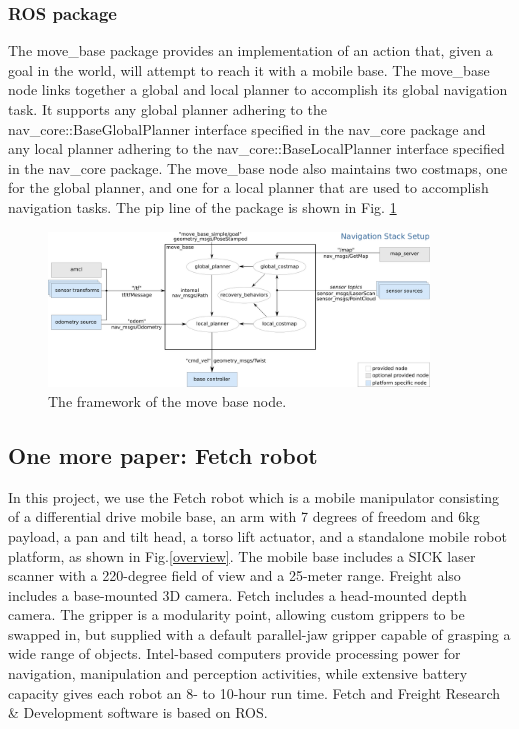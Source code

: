 \documentclass[12pt,draftclsnofoot,onecolumn]{IEEEtran}
\begin{document}
	\subsubsection{ROS package}
	The move\_base package provides an implementation of an action that, given a goal in the world, will attempt to reach it with a mobile base. The move\_base node links together a global and local planner to accomplish its global navigation task. 
	It supports any global planner adhering to the nav\_core::BaseGlobalPlanner interface specified in the nav\_core package 
	and any local planner adhering to the nav\_core::BaseLocalPlanner interface specified in the nav\_core package. 
	The move\_base node also maintains two costmaps, one for the global planner, 
	and one for a local planner that are used to accomplish navigation tasks.
	The pip line of the package is shown in Fig. \ref{movebase}
	\begin{figure}[H]    %
		\centering
		\includegraphics[width=0.9\textwidth]{img/movebase.png}
		\caption{
			The framework of the move base node.
		}
		\label{movebase}
	\end{figure}
	
	\subsection{One more paper: Fetch robot}   
	In this project, we use the Fetch robot \cite{wise2016fetch} which is a mobile manipulator consisting of a differential drive mobile base, an arm with 7 degrees of freedom and 6kg payload, a pan and tilt head, a torso lift actuator, and a standalone mobile robot platform, as shown in Fig.\ref{overview}. The mobile base includes a SICK laser scanner with a 220-degree field of view and a 25-meter range. Freight also includes a base-mounted 3D camera. Fetch includes a head-mounted depth camera. The gripper is a modularity point, allowing custom grippers to be swapped in, but supplied with a default parallel-jaw gripper capable of grasping a wide range of objects. Intel-based computers provide processing power for navigation, manipulation and perception activities, while extensive battery capacity gives each robot an 8- to 10-hour run time. Fetch and Freight Research & Development software is based on ROS. 
	
\end{document}
